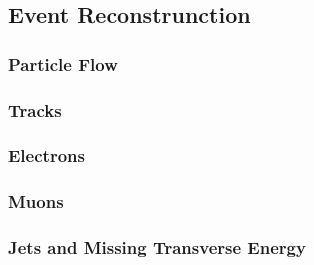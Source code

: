 \subsection{Event Reconstrunction}
\subsubsection{Particle Flow}
\subsubsection{Tracks}
\subsubsection{Electrons}
\subsubsection{Muons}
\subsubsection{Jets and Missing Transverse Energy}
